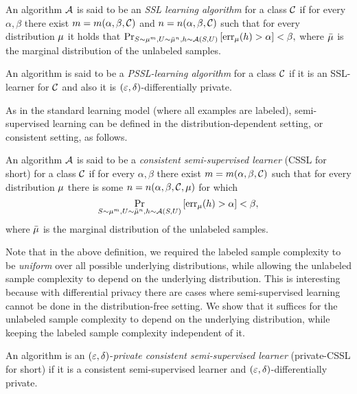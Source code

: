 \documentclass[12pt,a4paper,oneside,onecolumn]{book}
\begin{document}
\begin{definition}
An algorithm $\mathcal{A}$ is said to be an \emph{SSL learning algorithm} for a class $\mathcal{C}$ if for every $\alpha,\beta$ 
there exist 
$m=m(\alpha,\beta,\mathcal{C})$
and
$n=n(\alpha,\beta,\mathcal{C})$ 
such that for every distribution $\mu$ 
it holds that 
$
\Pr_{S\sim\mu^m,U\sim\bar{\mu}^n, h\sim\mathcal{A}(S,U)}\left[
\operatorname{err}_\mu(h) > \alpha
\right] < \beta, 
$
where $\bar{\mu}$ is the marginal distribution of the unlabeled samples.
\end{definition}



\begin{definition}
An algorithm is said to be a \emph{PSSL-learning algorithm} for a class $\mathcal{C}$ if it is an SSL-learner for $\mathcal{C}$ and also it is $(\varepsilon, \delta)$-differentially private.
\end{definition}



As in the standard learning model (where all examples are labeled), semi-supervised learning can be defined in the distribution-dependent setting, or consistent setting, as follows.



\begin{definition}
An algorithm $\mathcal{A}$ is said to be a \emph{consistent semi-supervised learner} (CSSL for short) for a class $\mathcal{C}$ if for every $\alpha,\beta$
there exist 
$m=m(\alpha,\beta,\mathcal{C})$
such that for every distribution $\mu$ there is some $n=n(\alpha,\beta,\mathcal{C},\mu)$ for which 
$$
\Pr_{S\sim\mu^m,U\sim\bar{\mu}^n, h\sim\mathcal{A}(S,U)}\left[
\operatorname{err}_\mu(h) > \alpha
\right] < \beta,
$$
where $\bar{\mu}$ is the marginal distribution of the unlabeled samples.
\end{definition}

Note that in the above definition, we required the labeled sample complexity to be {\em uniform} over all possible underlying distributions, while allowing the unlabeled sample complexity to depend on the underlying distribution. This is interesting because with differential privacy there are cases where semi-supervised learning cannot be done in the distribution-free setting. We show that it suffices for the unlabeled sample complexity to depend on the underlying distribution, while keeping the labeled sample complexity independent of it.


\begin{definition}
An algorithm is an
$(\varepsilon,\delta)$-\emph{private consistent semi-supervised learner} (private-CSSL for short)
if it is a consistent semi-supervised learner and \small{$(\varepsilon,\delta)$-differentially private}.
\end{definition}
\end{document}
